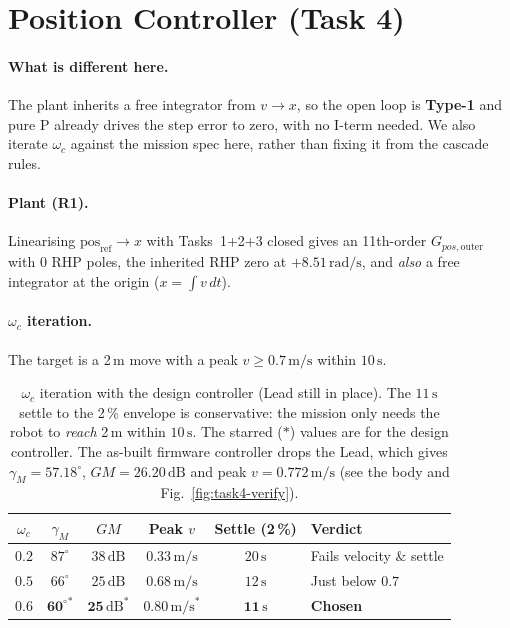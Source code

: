 \section{Position Controller (Task 4)}
\label{sec:position}

\paragraph{What is different here.} The plant inherits a free integrator from $v \to x$, so the open loop is \textbf{Type-1} and pure P already drives the step error to zero, with no I-term needed. We also iterate $\omega_c$ against the mission spec here, rather than fixing it from the cascade rules.

\paragraph{Plant (R1).} Linearising $\mathrm{pos}_{\mathrm{ref}} \to x$ with Tasks~1+2+3 closed gives an 11th-order $G_{pos,\mathrm{outer}}$ with $0$ RHP poles, the inherited RHP zero at $+8.51\,\mathrm{rad/s}$, and \emph{also} a free integrator at the origin ($x = \int v\,dt$).

\paragraph{$\omega_c$ iteration.} The target is a 2\,m move with a peak $v \geq 0.7\,\mathrm{m/s}$ within $10\,\mathrm{s}$.

\begin{table}[H]
    \centering\small
    \begin{tabular}{c|c|c|c|c|l}
        $\omega_c$ & $\gamma_M$ & $GM$ & Peak $v$ & Settle (2\,\%) & Verdict \\
        \hline
        $0.2$ & $87^{\circ}$ & $38\,\mathrm{dB}$ & $0.33\,\mathrm{m/s}$ & $20\,\mathrm{s}$ & Fails velocity \& settle \\
        $0.5$ & $66^{\circ}$ & $25\,\mathrm{dB}$ & $0.68\,\mathrm{m/s}$ & $12\,\mathrm{s}$ & Just below $0.7$ \\
        $\mathbf{0.6}$ & $\mathbf{60^{\circ}}^{*}$ & $\mathbf{25\,\mathrm{dB}}^{*}$ & $\mathbf{0.80\,\mathrm{m/s}}^{*}$ & $\mathbf{11\,\mathrm{s}}$ & \textbf{Chosen} \\
    \end{tabular}
    \caption{$\omega_c$ iteration with the design controller (Lead still in place). The $11\,\mathrm{s}$ settle to the 2\,\% envelope is conservative: the mission only needs the robot to \emph{reach} 2\,m within $10\,\mathrm{s}$. The starred ($*$) values are for the design controller. The as-built firmware controller drops the Lead, which gives $\gamma_M = 57.18^{\circ}$, $GM = 26.20\,\mathrm{dB}$ and peak $v = 0.772\,\mathrm{m/s}$ (see the body and Fig.~\ref{fig:task4-verify}).}
\end{table}

